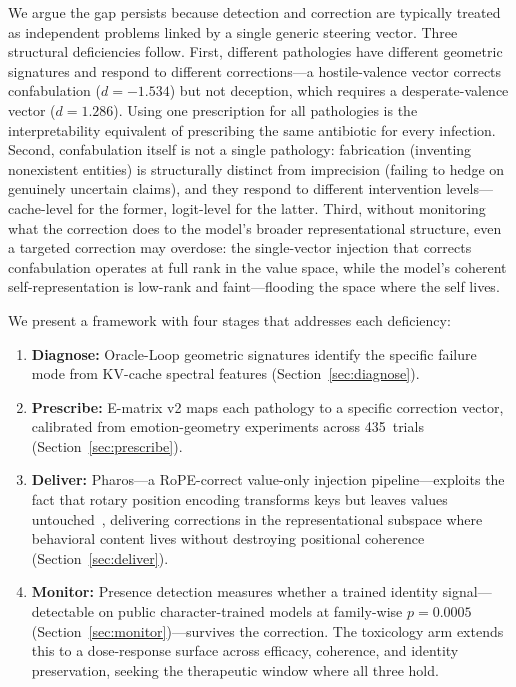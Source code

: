 \documentclass[11pt,a4paper]{article}
\begin{document}
We argue the gap persists because detection and correction are typically treated
as independent problems linked by a single generic steering vector. Three
structural deficiencies follow. First, different pathologies have different
geometric signatures and respond to different corrections---a hostile-valence
vector corrects confabulation ($d{=}{-}1.534$) but not deception, which requires
a desperate-valence vector ($d{=}1.286$). Using one prescription for all
pathologies is the interpretability equivalent of prescribing the same antibiotic
for every infection. Second, confabulation itself is not a single pathology:
fabrication (inventing nonexistent entities) is structurally distinct from
imprecision (failing to hedge on genuinely uncertain claims), and they respond
to different intervention levels---cache-level for the former, logit-level for
the latter. Third, without monitoring what the correction does to the model's
broader representational structure, even a targeted correction may overdose: the
single-vector injection that corrects confabulation operates at full rank in the
value space, while the model's coherent self-representation is low-rank and
faint---flooding the space where the self lives.

We present a framework with four stages that addresses each deficiency:
\begin{enumerate}[nosep]
  \item \textbf{Diagnose:} Oracle-Loop geometric signatures identify the
    specific failure mode from KV-cache spectral features
    (Section~\ref{sec:diagnose}).
  \item \textbf{Prescribe:} E-matrix v2 maps each pathology to a specific
    correction vector, calibrated from emotion-geometry experiments across
    435~trials (Section~\ref{sec:prescribe}).
  \item \textbf{Deliver:} Pharos---a RoPE-correct value-only injection
    pipeline---exploits the fact that rotary position encoding transforms keys
    but leaves values untouched~\citep{pustovit2026knowledge}, delivering
    corrections in the representational subspace where behavioral content lives
    without destroying positional coherence (Section~\ref{sec:deliver}).
  \item \textbf{Monitor:} Presence detection measures whether a trained identity
    signal---detectable on public character-trained models at family-wise
    $p{=}0.0005$ (Section~\ref{sec:monitor})---survives the correction. The
    toxicology arm extends this to a dose-response surface across efficacy,
    coherence, and identity preservation, seeking the therapeutic window where
    all three hold.
\end{enumerate}
\end{document}
